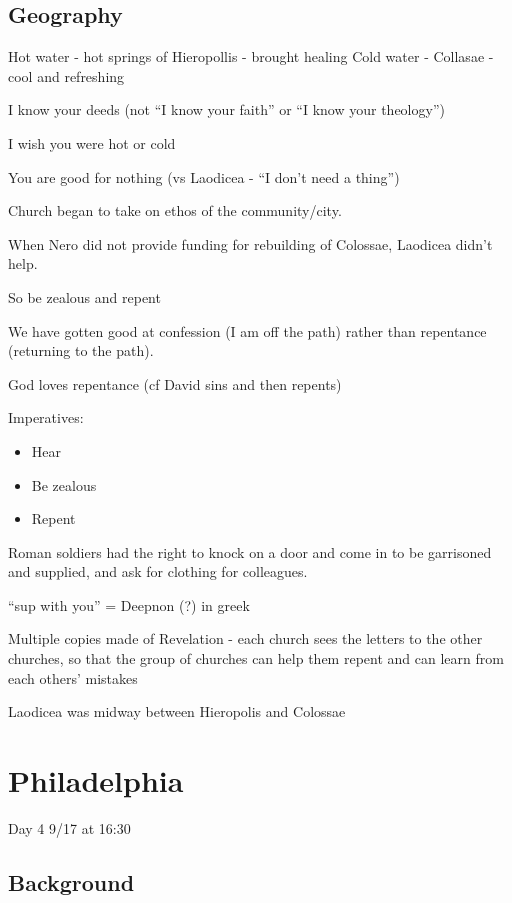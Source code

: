 \documentclass[
]{book}
\providecommand{\tightlist}{%
  \setlength{\itemsep}{0pt}\setlength{\parskip}{0pt}}
\begin{document}
\hypertarget{geography-4}{%
\section{Geography}\label{geography-4}}

Hot water - hot springs of Hieropollis - brought healing
Cold water - Collasae - cool and refreshing

I know your deeds (not ``I know your faith'' or ``I know your theology'')

I wish you were hot or cold

You are good for nothing (vs Laodicea - ``I don't need a thing'')

Church began to take on ethos of the community/city.

When Nero did not provide funding for rebuilding of Colossae, Laodicea didn't help.

So be zealous and repent

We have gotten good at confession (I am off the path) rather than repentance (returning to the path).

God loves repentance (cf David sins and then repents)

Imperatives:

\begin{itemize}
\tightlist
\item
  Hear
\item
  Be zealous
\item
  Repent
\end{itemize}

Roman soldiers had the right to knock on a door and come in to be garrisoned and supplied, and ask for clothing for colleagues.

``sup with you'' = Deepnon (?) in greek

Multiple copies made of Revelation - each church sees the letters to the other churches, so that the group of churches can help them repent and can learn from each others' mistakes

Laodicea was midway between Hieropolis and Colossae

\hypertarget{philadelphia}{%
\chapter{Philadelphia}\label{philadelphia}}

Day 4 9/17 at 16:30

\hypertarget{background-1}{%
\section{Background}\label{background-1}}
\end{document}

